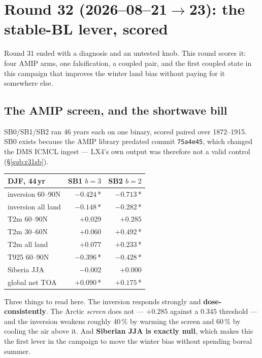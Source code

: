 \documentclass[10pt]{article}
\begin{document}
\section{Round 32 (2026--08--21$\to$23): the stable-BL lever, scored}\label{sec:round32}

Round 31 ended with a diagnosis and an untested knob. This round scores it: four AMIP arms,
one falsification, a coupled pair, and the first coupled state in this campaign that
improves the winter land bias without paying for it somewhere else.

\subsection{The AMIP screen, and the shortwave bill}\label{sub:r32amip}

SB0/SB1/SB2 ran 46 years each on one binary, scored paired over 1872--1915. SB0 exists
because the AMIP library predated commit \texttt{75a4e45}, which changed the DMS ICMCL
ingest --- LX4's own output was therefore not a valid control (\S\ref{sub:r31sb}).

\begin{center}\small
\begin{tabular}{lrr}
\toprule
DJF, 44\,yr & \textbf{SB1} $b{=}3$ & \textbf{SB2} $b{=}2$ \\
\midrule
inversion 60--90N & $-0.424$\,* & $-0.713$\,* \\
inversion all land & $-0.148$\,* & $-0.282$\,* \\
T2m 60--90N & $+0.029$ & $+0.285$ \\
T2m 30--60N & $+0.060$ & $+0.492$\,* \\
T2m all land & $+0.077$ & $+0.233$\,* \\
T925 60--90N & $-0.396$\,* & $-0.428$\,* \\
Siberia JJA & $-0.002$ & $+0.000$ \\
global net TOA & $+0.090$\,* & $+0.175$\,* \\
\bottomrule
\end{tabular}
\end{center}

Three things to read here. The inversion responds strongly and \textbf{dose-consistently}.
The Arctic \emph{screen} does not --- $+0.285$ against a $0.345$ threshold --- and the
inversion weakens roughly 40\,\% by warming the screen and 60\,\% by cooling the air above
it. And \textbf{Siberian JJA is exactly null}, which makes this the first lever in the
campaign to move the winter bias without spending boreal summer.
\end{document}
